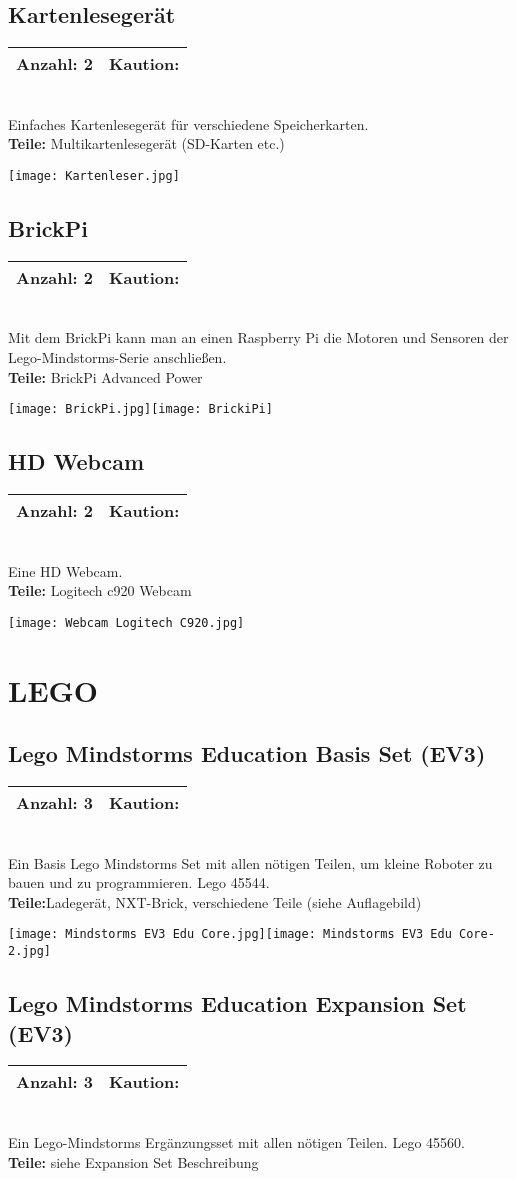 \documentclass[a4paper]{article}
\newcommand{\infobox}[3] %
        {\par
                \begin{tabular}{| c | c | }
                \hline
                Anzahl: #1 & Kaution: \EUR{#3}   \\
                \hline
                \end{tabular} \\
        }
\begin{document}
\subsection{Kartenlesegerät}
\infobox{2}{0}{0}
Einfaches Kartenlesegerät für verschiedene Speicherkarten.\\
\textbf{Teile:} Multikartenlesegerät (SD-Karten etc.)

\texttt{[image: Kartenleser.jpg]}

\subsection{BrickPi}
\infobox{2}{0}{0}
Mit dem BrickPi kann man an einen Raspberry Pi die Motoren und Sensoren der Lego-Mindstorms-Serie anschließen.\\
\textbf{Teile:} BrickPi Advanced Power

\texttt{[image: BrickPi.jpg]}\texttt{[image: BrickiPi]}

\subsection{HD Webcam}
\infobox{2}{1}{0}
Eine HD Webcam. \\ 
\textbf{Teile:} Logitech c920 Webcam

\texttt{[image: Webcam Logitech C920.jpg]}

\newpage

\section{LEGO}

\subsection{Lego Mindstorms Education Basis Set (EV3)}
\infobox{3}{2}{20}
Ein Basis Lego Mindstorms Set mit allen nötigen Teilen, um kleine Roboter zu bauen und zu programmieren. Lego 45544. \\
\textbf{Teile:}Ladegerät, NXT-Brick, verschiedene Teile (siehe Auflagebild)

\texttt{[image: Mindstorms EV3 Edu Core.jpg]}\texttt{[image: Mindstorms EV3 Edu Core-2.jpg]}

\subsection{Lego Mindstorms Education Expansion Set (EV3)}
\infobox{3}{2}{10}
Ein Lego-Mindstorms Ergänzungsset mit allen nötigen Teilen. Lego 45560. \\
\textbf{Teile:} siehe Expansion Set Beschreibung
\end{document}
